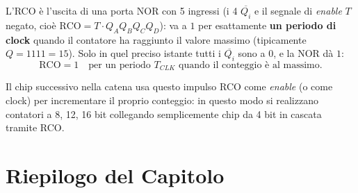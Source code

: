 L'RCO è l'uscita di una porta NOR con 5 ingressi (i 4 $\overline{Q_i}$ e il segnale di \emph{enable} $T$ negato, cioè $\text{RCO}=T\cdot Q_AQ_BQ_CQ_D$): va a $1$ per esattamente \textbf{un periodo di clock} quando il contatore ha raggiunto il valore massimo (tipicamente $Q=1111=15$). Solo in quel preciso istante tutti i $\overline{Q_i}$ sono a $0$, e la NOR dà $1$:
\[
\text{RCO} = 1 \quad \text{per un periodo } T_{CLK} \text{ quando il conteggio è al massimo.}
\]

\noindent Il chip successivo nella catena usa questo impulso RCO come \emph{enable} (o come clock) per incrementare il proprio conteggio: in questo modo si realizzano contatori a 8, 12, 16 bit collegando semplicemente chip da 4 bit in cascata tramite RCO.

\begin{center}
\end{center}

\section*{Riepilogo del Capitolo}

